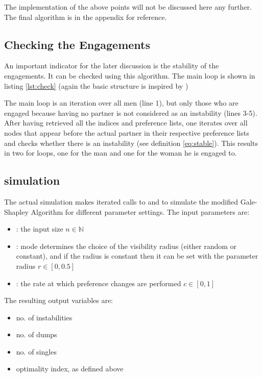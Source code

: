 \documentclass[11pt]{article}
\begin{document}
The implementation of the above points will not be discussed here any further. The final algorithm is in the appendix for reference.

\subsection{Checking the Engagements} \label{check}

An important indicator for the later discussion is the stability of the engagements. It can be checked using this algorithm. The main loop is
shown in listing \ref{lst:check} (again the basic structure is inspired by \citet{rosetta})



The main loop is an iteration over all men (line 1), but only those who are engaged because having no partner is not considered as an instability
(lines 3-5). After having retrieved all the indices and preference lists, one iterates over all nodes that appear before the actual partner in their
respective preference lists and checks whether there is an instability (see definition \ref{eq:stable}). This results in two for loops, one for the
man and one for the woman he is engaged to.

\subsection{simulation}

The actual simulation makes iterated calls to  and  to simulate the modified Gale-Shapley Algorithm
for different parameter settings. The input parameters are:

\begin{itemize}
  \item {}: the input size $n\in\mathbb{N}$
  \item {}: mode determines the choice of the visibility radius (either random or constant), and if the radius is constant
  then it can be set with the parameter radius $r\in[0,0.5]$
  \item {}: the rate at which preference changes are performed $c\in[0,1]$
\end{itemize}

The resulting output variables are:

\begin{itemize}
  \item no. of instabilities
  \item no. of dumps
  \item no. of singles
  \item optimality index, as defined above
\end{itemize}
\end{document}
